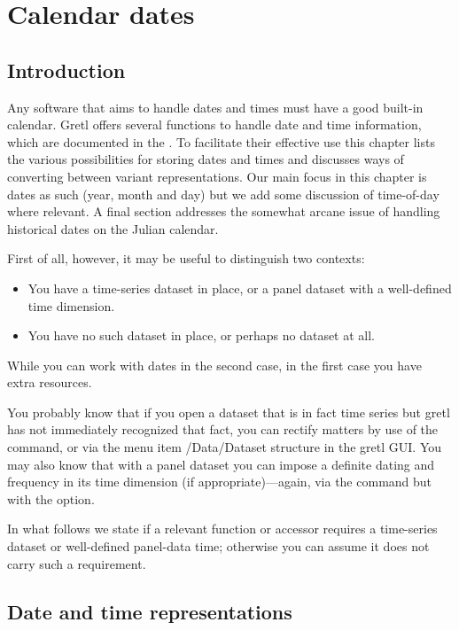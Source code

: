 \chapter{Calendar dates}
\label{chap:calendar}

\section{Introduction}
\label{sec:cal-intro}

Any software that aims to handle dates and times must have a good
built-in calendar. Gretl offers several functions to handle date and
time information, which are documented in the \GCR{}. To facilitate
their effective use this chapter lists the various possibilities for
storing dates and times and discusses ways of converting between
variant representations.  Our main focus in this chapter is dates as
such (year, month and day) but we add some discussion of time-of-day
where relevant. A final section addresses the somewhat arcane issue
of handling historical dates on the Julian calendar.

First of all, however, it may be useful to distinguish two contexts:
\begin{itemize}
\item You have a time-series dataset in place, or a panel dataset with
  a well-defined time dimension.
\item You have no such dataset in place, or perhaps no dataset at all.
\end{itemize}

While you can work with dates in the second case, in the first case
you have extra resources.

You probably know that if you open a dataset that is in fact time
series but gretl has not immediately recognized that fact, you can
rectify matters by use of the  command, or via the menu
item \textsf{/Data/Dataset structure} in the gretl GUI. You may also
know that with a panel dataset you can impose a definite dating and
frequency in its time dimension (if appropriate)---again, via the
 command but with the  option.

In what follows we state if a relevant function or accessor requires a
time-series dataset or well-defined panel-data time; otherwise you can
assume it does not carry such a requirement.

\section{Date and time representations}
\label{sec:cal-representations}

